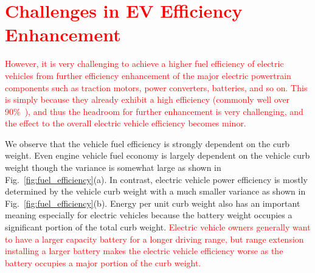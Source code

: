 \documentclass[journal]{IEEEtran}
\begin{document}
\section{\textcolor{red}{Challenges in EV Efficiency Enhancement}}

\textcolor{red}{However, it is very challenging to achieve a higher fuel efficiency of electric vehicles from further efficiency enhancement of the major electric powertrain components such as traction motors, power converters, batteries, and so on. 
This is simply because they already exhibit a high efficiency (commonly well over 90\%~\cite{Burress:OAK_RIDGE16}), and thus the headroom for further enhancement is very challenging, and the effect to the overall electric vehicle efficiency becomes minor.}

We observe that the vehicle fuel efficiency is strongly dependent on the curb weight. 
Even engine vehicle fuel economy is largely dependent on the vehicle curb weight though the variance is somewhat large as shown in Fig.~\ref{fig:fuel_efficiency}(a). In contrast, electric vehicle power efficiency is mostly determined by the vehicle curb weight with a much smaller variance as shown in Fig.~\ref{fig:fuel_efficiency}(b). 
Energy per unit curb weight also has an important meaning especially for electric vehicles because the battery weight occupies a significant portion of the total curb weight. 
\textcolor{red}{Electric vehicle owners generally want to have a larger capacity battery for a longer driving range, but range extension installing a larger battery makes the electric vehicle efficiency worse as the battery occupies a major portion of the curb weight.}
\end{document}
